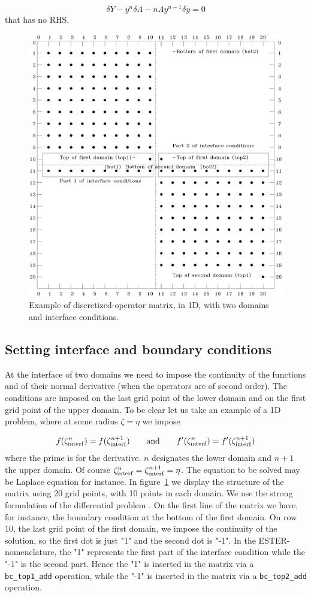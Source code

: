\[ \delta Y - y^n\delta\Lambda - n\Lambda y^{n-1}\delta y = 0\]
that has no RHS.



\begin{figure}[t]
\centering
\includegraphics[width=0.8\linewidth]{fig/matrix_pedago.eps}
\caption{Example of discretized-operator matrix, in 1D, with two domains and
interface conditions.}
\label{matp}
\end{figure}

\subsection{Setting interface and boundary conditions}

At the interface of two domains we need to impose the continuity of the
functions and of their normal derivative (when the operators are of
second order). The conditions are imposed on the last grid point of the
lower domain and on the first grid point of the upper domain. To be
clear let us take an example of a 1D problem, where at some radius
$\zeta=\eta$ we impose

\[ f(\zeta_{\rm interf}^n) = f(\zeta_{\rm interf}^{n+1}) \qquad {\rm and}\qquad f'(\zeta_{\rm
interf}^n) = f'(\zeta_{\rm interf}^{n+1})\]
where the prime is for the derivative. $n$ designates the lower domain
and $n+1$ the upper domain. Of course $\zeta_{\rm interf}^n=\zeta_{\rm
interf}^{n+1}=\eta$. The equation to be solved may be Laplace
equation for instance. In figure~\ref{matp} we display the structure of the
matrix using 20 grid points, with 10 points in each domain. We use the
strong formulation of the differential problem \cite[][]{RELP16}. On the
first line of the matrix we have, for instance, the boundary condition
at the bottom of the first domain. On row 10, the last grid point of the
first domain, we impose the continuity of the solution, so the first dot
is just "1" and the second dot is "-1". In the ESTER-nomenclature, the
"1" represents the first part of the interface condition while the "-1"
is the second part. Hence the "1" is inserted in the matrix via a {\tt
bc\_top1\_add} operation, while the "-1" is inserted in the matrix via a
{\tt bc\_top2\_add}  operation.

